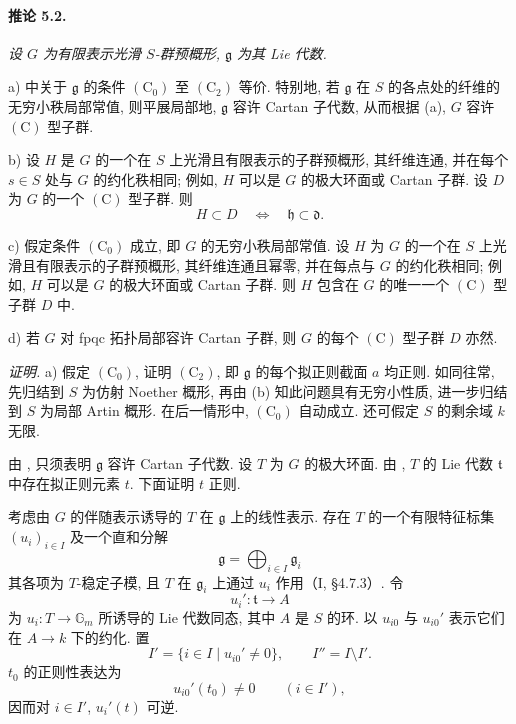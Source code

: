 \paragraph{\textbf{推论 5.2.}}
{\itshape 设 \(G\) 为有限表示光滑 \(S\)-群预概形, \(\mathfrak g\) 为其 Lie 代数.

\smallskip
\noindent
\textup{a)}  中关于 \(\mathfrak g\) 的条件 \((\mathrm C_0)\) 至 \((\mathrm C_2)\) 等价. 特别地, 若 \(\mathfrak g\) 在 \(S\) 的各点处的纤维的无穷小秩局部常值, 则平展局部地, \(\mathfrak g\) 容许 Cartan 子代数, 从而根据 \textup{(a)}, \(G\) 容许 \((\mathrm C)\) 型子群.

\smallskip
\noindent
\textup{b)} 设 \(H\) 是 \(G\) 的一个在 \(S\) 上光滑且有限表示的子群预概形, 其纤维连通, 并在每个 \(s\in S\) 处与 \(G\) 的约化秩相同; 例如, \(H\) 可以是 \(G\) 的极大环面或 Cartan 子群. 设 \(D\) 为 \(G\) 的一个 \((\mathrm C)\) 型子群. 则
\[
  H\subset D\quad\Longleftrightarrow\quad
  \mathfrak h\subset\mathfrak d.
\]

\smallskip
\noindent
\textup{c)} 假定条件 \((\mathrm C_0)\) 成立, 即 \(G\) 的无穷小秩局部常值. 设 \(H\) 为 \(G\) 的一个在 \(S\) 上光滑且有限表示的子群预概形, 其纤维连通且幂零, 并在每点与 \(G\) 的约化秩相同; 例如, \(H\) 可以是 \(G\) 的极大环面或 Cartan 子群. 则 \(H\) 包含在 \(G\) 的唯一一个 \((\mathrm C)\) 型子群 \(D\) 中.

\smallskip
\noindent
\textup{d)} 若 \(G\) 对 fpqc 拓扑局部容许 Cartan 子群, 则 \(G\) 的每个 \((\mathrm C)\) 型子群 \(D\) 亦然.}

\smallskip
\noindent
\emph{证明.}
\textup{a)}
假定 \((\mathrm C_0)\), 证明 \((\mathrm C_2)\), 即 \(\mathfrak g\) 的每个拟正则截面 \(a\) 均正则. 如同往常, 先归结到 \(S\) 为仿射 Noether 概形, 再由 \textup{(b)} 知此问题具有无穷小性质, 进一步归结到 \(S\) 为局部 Artin 概形. 在后一情形中, \((\mathrm C_0)\) 自动成立. 还可假定 \(S\) 的剩余域 \(k\) 无限.

由 , 只须表明 \(\mathfrak g\) 容许 Cartan 子代数. 设 \(T\) 为 \(G\) 的极大环面. 由 , \(T\) 的 Lie 代数 \(\mathfrak t\) 中存在拟正则元素 \(t\). 下面证明 \(t\) 正则.

考虑由 \(G\) 的伴随表示诱导的 \(T\) 在 \(\mathfrak g\) 上的线性表示. 存在 \(T\) 的一个有限特征标集 \((u_i)_{i\in I}\) 及一个直和分解
\[
  \mathfrak g=\bigoplus_{i\in I}\mathfrak g_i
\]
其各项为 \(T\)-稳定子模, 且 \(T\) 在 \(\mathfrak g_i\) 上通过 \(u_i\) 作用\textup{（I, \S4.7.3）}. 令
\[
  u_i'\colon\mathfrak t\longrightarrow A
\]
为 \(u_i\colon T\to\mathbb G_m\) 所诱导的 Lie 代数同态, 其中 \(A\) 是 \(S\) 的环. 以 \(u_{i0}\) 与 \(u_{i0}'\) 表示它们在 \(A\to k\) 下的约化. 置
\[
  I'=\{i\in I\mid u_{i0}'\ne0\},
  \qquad I''=I\setminus I'.
\]
\(t_0\) 的正则性表达为
\[
  u_{i0}'(t_0)\ne0\qquad(i\in I'),
\]
因而对 \(i\in I'\), \(u_i'(t)\) 可逆.

